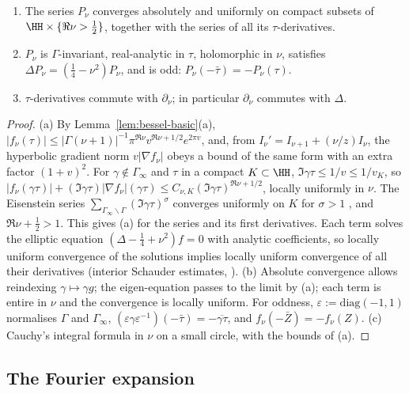 \begin{proposition}\label{prop:niebur}
\begin{enumerate}[label=\textup{(\alph*)}]
\item The series $P_\nu$ converges absolutely and uniformly on compact subsets of $\HH\times\{\Re\nu>\frac12\}$, together with the series of
all its $\tau$-derivatives.
\item $P_\nu$ is $\Gamma$-invariant, real-analytic in $\tau$, holomorphic in $\nu$, satisfies $\Delta P_\nu=(\frac14-\nu^2)P_\nu$, and is odd:
$P_\nu(-\bar\tau)=-P_\nu(\tau)$.
\item $\tau$-derivatives commute with $\partial_\nu$; in particular $\partial_\nu$ commutes with $\Delta$.
\end{enumerate}
\end{proposition}

\begin{proof}
(a) By Lemma~\ref{lem:bessel-basic}(a), $|f_\nu(\tau)|\le|\Gamma(\nu+1)|^{-1}\pi^{\Re\nu}v^{\Re\nu+1/2}e^{2\pi v}$, and, from
$I_\nu'=I_{\nu+1}+(\nu/z)I_\nu$, the hyperbolic gradient norm $v|\nabla f_\nu|$ obeys a bound of the same form with an extra factor $(1+v)^2$. For
$\gamma\notin\Gamma_\infty$ and $\tau$ in a compact $K\subset\HH$, $\Im\gamma\tau\le1/v\le1/v_K$, so
$|f_\nu(\gamma\tau)|+(\Im\gamma\tau)|\nabla f_\nu|(\gamma\tau)\le C_{\nu,K}(\Im\gamma\tau)^{\Re\nu+1/2}$, locally uniformly in $\nu$. The Eisenstein
series $\sum_{\Gamma_\infty\backslash\Gamma}(\Im\gamma\tau)^\sigma$ converges uniformly on $K$ for $\sigma>1$ \cite[\S3]{Iwa02}, and
$\Re\nu+\frac12>1$. This gives (a) for the series and its first derivatives. Each term solves the elliptic equation $(\Delta-\frac14+\nu^2)f=0$
with analytic coefficients, so locally uniform convergence of the solutions implies locally uniform convergence of all their derivatives
(interior Schauder estimates, \cite[Theorems~6.2 and~6.17]{GT01}).
(b) Absolute convergence allows reindexing $\gamma\mapsto\gamma g$; the eigen-equation passes to the limit by (a); each term is entire in
$\nu$ and the convergence is locally uniform. For oddness, $\varepsilon:=\mathrm{diag}(-1,1)$ normalises $\Gamma$ and $\Gamma_\infty$,
$(\varepsilon\gamma\varepsilon^{-1})(-\bar\tau)=-\overline{\gamma\tau}$, and $f_\nu(-\bar Z)=-f_\nu(Z)$.
(c) Cauchy's integral formula in $\nu$ on a small circle, with the bounds of (a).
\end{proof}

\subsection{The Fourier expansion}

